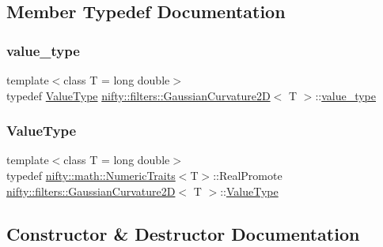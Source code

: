 \subsection{Member Typedef Documentation}
\mbox{\label{classnifty_1_1filters_1_1GaussianCurvature2D_affdbbda626530a7cd63878ca62f3682b}} 
\subsubsection{\texorpdfstring{value\+\_\+type}{value\_type}}
{\footnotesize\ttfamily template$<$class T = long double$>$ \\
typedef \hyperlink{classnifty_1_1filters_1_1GaussianCurvature2D_af2739080c97506f5e72ebd4e69652311}{Value\+Type} \hyperlink{classnifty_1_1filters_1_1GaussianCurvature2D}{nifty\+::filters\+::\+Gaussian\+Curvature2D}$<$ T $>$\+::\hyperlink{classnifty_1_1filters_1_1GaussianCurvature2D_affdbbda626530a7cd63878ca62f3682b}{value\+\_\+type}}

\mbox{\label{classnifty_1_1filters_1_1GaussianCurvature2D_af2739080c97506f5e72ebd4e69652311}} 
\subsubsection{\texorpdfstring{Value\+Type}{ValueType}}
{\footnotesize\ttfamily template$<$class T = long double$>$ \\
typedef \hyperlink{structnifty_1_1math_1_1NumericTraits}{nifty\+::math\+::\+Numeric\+Traits}$<$T$>$\+::Real\+Promote \hyperlink{classnifty_1_1filters_1_1GaussianCurvature2D}{nifty\+::filters\+::\+Gaussian\+Curvature2D}$<$ T $>$\+::\hyperlink{classnifty_1_1filters_1_1GaussianCurvature2D_af2739080c97506f5e72ebd4e69652311}{Value\+Type}}



\subsection{Constructor \& Destructor Documentation}
\mbox{\label{classnifty_1_1filters_1_1GaussianCurvature2D_a7405c5ba396d45a1f3e68db31835149e}} 
